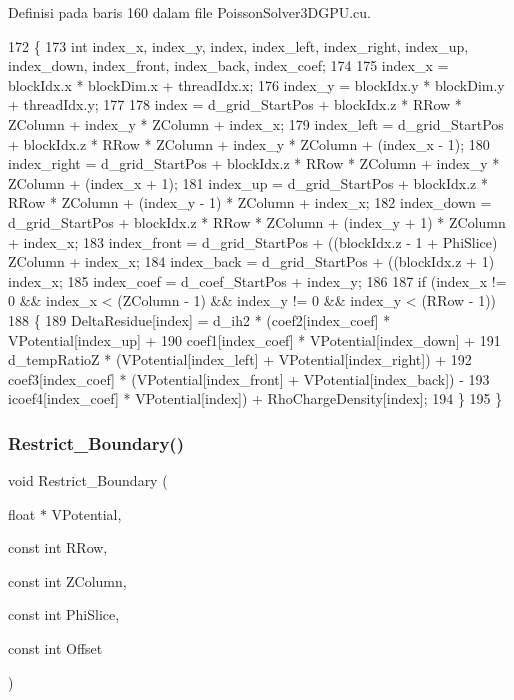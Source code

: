 Definisi pada baris 160 dalam file Poisson\+Solver3\+D\+G\+P\+U.\+cu.


\begin{DoxyCode}
172 \{
173     \textcolor{keywordtype}{int} index\_x, index\_y, index, index\_left, index\_right, index\_up, index\_down, index\_front, index\_back, 
      index\_coef;
174 
175     index\_x = blockIdx.x * blockDim.x + threadIdx.x;
176     index\_y = blockIdx.y * blockDim.y + threadIdx.y;
177 
178     index       = d\_grid\_StartPos + blockIdx.z * RRow * ZColumn + index\_y * ZColumn + index\_x;
179     index\_left  = d\_grid\_StartPos + blockIdx.z * RRow * ZColumn + index\_y * ZColumn + (index\_x - 1);
180     index\_right = d\_grid\_StartPos + blockIdx.z * RRow * ZColumn + index\_y * ZColumn + (index\_x + 1);
181     index\_up    = d\_grid\_StartPos + blockIdx.z * RRow * ZColumn + (index\_y - 1) * ZColumn + index\_x;
182     index\_down  = d\_grid\_StartPos + blockIdx.z * RRow * ZColumn + (index\_y + 1) * ZColumn + index\_x;
183     index\_front = d\_grid\_StartPos + ((blockIdx.z - 1 + PhiSlice) %
      ZColumn + index\_x;
184     index\_back  = d\_grid\_StartPos + ((blockIdx.z + 1) %
      index\_x;
185     index\_coef  = d\_coef\_StartPos + index\_y;
186 
187     \textcolor{keywordflow}{if} (index\_x != 0 && index\_x < (ZColumn - 1) && index\_y != 0 && index\_y < (RRow - 1))
188     \{
189         DeltaResidue[index] = d\_ih2 * (coef2[index\_coef] * VPotential[index\_up] +
190                         coef1[index\_coef] * VPotential[index\_down] +
191                         d\_tempRatioZ * (VPotential[index\_left] + VPotential[index\_right]) +
192                         coef3[index\_coef] * (VPotential[index\_front] + VPotential[index\_back]) -
193                         icoef4[index\_coef] * VPotential[index]) + RhoChargeDensity[index];
194     \}
195 \}
\end{DoxyCode}
\hypertarget{PoissonSolver3DGPU_8cu_a1b6e721fb1d6d9d4155465f1af16c8aa}{}\label{PoissonSolver3DGPU_8cu_a1b6e721fb1d6d9d4155465f1af16c8aa} 
\subsubsection{\texorpdfstring{Restrict\+\_\+\+Boundary()}{Restrict\_Boundary()}}
{\footnotesize\ttfamily void Restrict\+\_\+\+Boundary (\begin{DoxyParamCaption}\item[{float $\ast$}]{V\+Potential,  }\item[{const int}]{R\+Row,  }\item[{const int}]{Z\+Column,  }\item[{const int}]{Phi\+Slice,  }\item[{const int}]{Offset }\end{DoxyParamCaption})}

